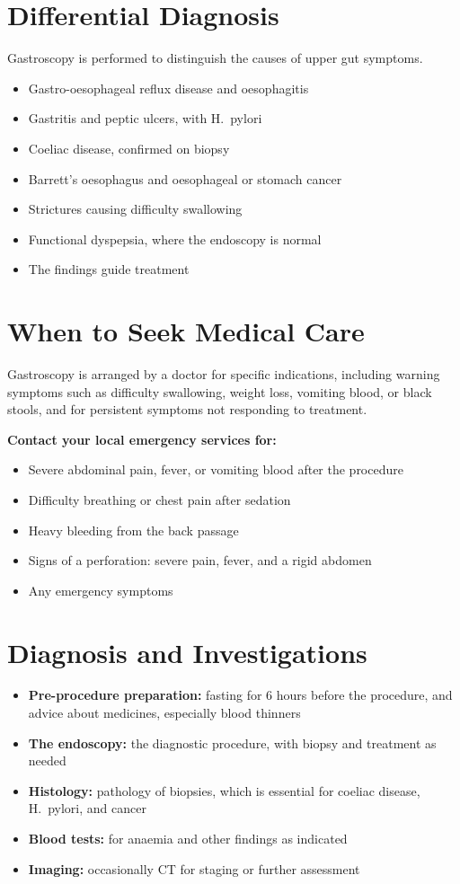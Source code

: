 \section*{Differential Diagnosis}
Gastroscopy is performed to distinguish the causes of upper gut symptoms.
\begin{itemize}
    \item Gastro-oesophageal reflux disease and oesophagitis
    \item Gastritis and peptic ulcers, with H.\ pylori
    \item Coeliac disease, confirmed on biopsy
    \item Barrett's oesophagus and oesophageal or stomach cancer
    \item Strictures causing difficulty swallowing
    \item Functional dyspepsia, where the endoscopy is normal
    \item The findings guide treatment
\end{itemize}

\section*{When to Seek Medical Care}
Gastroscopy is arranged by a doctor for specific indications, including warning symptoms such as difficulty swallowing, weight loss, vomiting blood, or black stools, and for persistent symptoms not responding to treatment.

\textbf{Contact your local emergency services for:}
\begin{itemize}
    \item Severe abdominal pain, fever, or vomiting blood after the procedure
    \item Difficulty breathing or chest pain after sedation
    \item Heavy bleeding from the back passage
    \item Signs of a perforation: severe pain, fever, and a rigid abdomen
    \item Any emergency symptoms
\end{itemize}

\section*{Diagnosis and Investigations}
\begin{itemize}
    \item \textbf{Pre-procedure preparation:} fasting for 6 hours before the procedure, and advice about medicines, especially blood thinners
    \item \textbf{The endoscopy:} the diagnostic procedure, with biopsy and treatment as needed
    \item \textbf{Histology:} pathology of biopsies, which is essential for coeliac disease, H.\ pylori, and cancer
    \item \textbf{Blood tests:} for anaemia and other findings as indicated
    \item \textbf{Imaging:} occasionally CT for staging or further assessment
\end{itemize}

